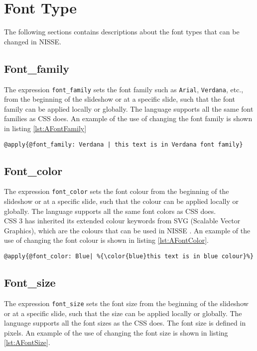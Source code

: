 \section{Font Type}
\label{AppendixFontType}
The following sections contains descriptions about the font types that can be changed in NISSE.

\subsection{Font\_family}
The expression \texttt{font\_family} sets the font family such as \texttt{Arial}, \texttt{Verdana}, etc., from the beginning of the slideshow or at a specific slide, such that the font family can be applied locally or globally. The language supports all the same font families as CSS does. An example of the use of changing the font family is shown in listing \ref{lst:AFontFamily}

\begin{lstlisting}[frame=single, caption=Changing font family, label=lst:AFontFamily ]
	@apply{@font_family: Verdana | this text is in Verdana font family}
\end{lstlisting}

\subsection{Font\_color}
The expression \texttt{font\_color} sets the font colour from the beginning of the slideshow or at a specific slide, such that the colour can be applied locally or globally. The language supports all the same font colors as CSS does. \\
CSS 3 has inherited its extended colour keywords from SVG (Scalable Vector Graphics), which are the colours that can be used in NISSE \cite{W3}. An example of the use of changing the font colour is shown in listing \ref{lst:AFontColor}.

\begin{lstlisting}[frame=single, caption=Changing font colour, label=lst:AFontColor]
	@apply{@font_color: Blue| %{\color{blue}this text is in blue colour}%}
\end{lstlisting}

\subsection{Font\_size}
The expression \texttt{font\_size} sets the font size from the beginning of the slideshow or at a specific slide, such that the size can be applied locally or globally. The language supports all the font sizes as the CSS does. The font size is defined in pixels. An example of the use of changing the font size is shown in listing \ref{lst:AFontSize}.

